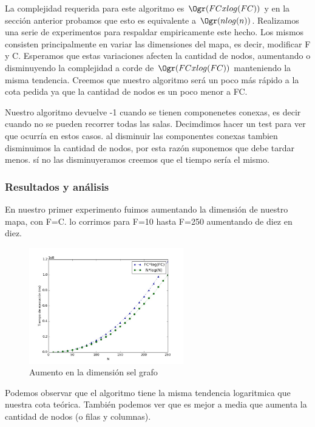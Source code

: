 \documentclass[spanish,12pt]{article}
\begin{document}
La complejidad requerida para este algoritmo es $\Ogr(FCxlog(FC))$ y en la sección anterior probamos que esto es equivalente a  $\Ogr(nlog(n))$.
Realizamos una serie de experimentos para respaldar empiricamente este hecho.
Los mismos consisten principalmente en variar las dimensiones del mapa, es decir, modificar F y C. Esperamos que estas variaciones afecten la cantidad de nodos, aumentando o disminuyendo la complejidad a corde de $\Ogr(FCxlog(FC))$ manteniendo la misma tendencia. 
Creemos que nuestro algoritmo será un poco más rápido a la cota pedida ya que la cantidad de nodos es un poco menor a FC.

Nuestro algoritmo devuelve -1 cuando se tienen componenetes conexas, es decir cuando no se pueden recorrer todas las salas. Decimdimos hacer un test para ver que ocurría en estos casos. al disminuir las componentes conexas tambien disminuimos la cantidad de nodos, por esta razón suponemos que debe tardar menos. sí no las disminuyeramos creemos que el tiempo sería el mismo.

\subsubsection{Resultados y análisis}

En nuestro primer experimento fuimos aumentando la dimensión de nuestro mapa, con F=C. lo corrimos para F=10 hasta F=250 aumentando de diez en diez.

\begin{figure}[H]
\centering
\includegraphics[width=0.6\textwidth]{sinParedes}
\caption{Aumento en la dimensión sel grafo}
\end{figure}

Podemos observar que el algoritmo tiene la misma tendencia logaritmica que nuestra cota teórica. También podemos ver que es mejor a media que aumenta la cantidad de nodos (o filas y columnas).
\end{document}
